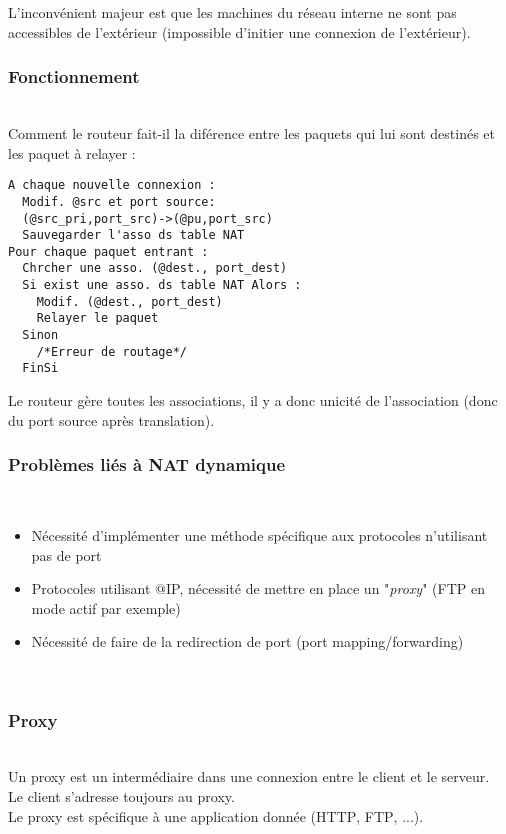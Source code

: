 \documentclass[journal, a4paper]{IEEEtran}
\begin{document}
L'inconvénient majeur est que les machines du réseau interne ne sont pas accessibles de l'extérieur (impossible d'initier une connexion de l'extérieur).
\newpage

\subsubsection{Fonctionnement}
~\\
Comment le routeur fait-il la diférence entre les paquets qui lui sont destinés et les paquet à relayer :

\begin{lstlisting}
A chaque nouvelle connexion :
  Modif. @src et port source:
  (@src_pri,port_src)->(@pu,port_src)
  Sauvegarder l'asso ds table NAT
Pour chaque paquet entrant :
  Chrcher une asso. (@dest., port_dest)
  Si exist une asso. ds table NAT Alors :
    Modif. (@dest., port_dest)
    Relayer le paquet
  Sinon
    /*Erreur de routage*/
  FinSi
\end{lstlisting}

Le routeur gère toutes les associations, il y a donc unicité de l'association (donc du port source après translation).
~\\
\subsubsection{Problèmes liés à NAT dynamique}
~\\
\begin{itemize}
	\item Nécessité d'implémenter une méthode spécifique aux protocoles n'utilisant pas de port
	\item Protocoles utilisant @IP, nécessité de mettre en place un "\textit{proxy}" (\textsc{FTP} en mode actif par exemple)
	\item Nécessité de faire de la redirection de port (port mapping/forwarding)
\end{itemize}

~\\
\subsubsection{Proxy}
~\\
Un proxy est un intermédiaire dans une connexion entre le client et le serveur.\\
Le client s'adresse toujours au proxy.\\
Le proxy est spécifique à une application donnée (\textsc{HTTP}, \textsc{FTP}, ...).
	
\end{document}
